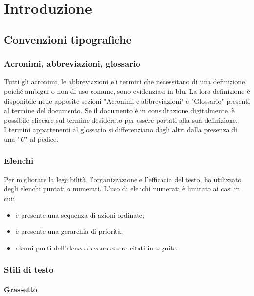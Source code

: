 \chapter{Introduzione}
\label{cap:introduzione}

\section{Convenzioni tipografiche}

\subsection{Acronimi, abbreviazioni, glossario}

Tutti gli acronimi, le abbreviazioni e i termini che necessitano di una definizione, poiché ambigui o non di uso comune, sono evidenziati in blu. La loro definizione è disponibile nelle apposite sezioni "Acronimi e abbreviazioni" e "Glossario" presenti al termine del documento. Se il documento è in consultazione digitalmente, è possibile cliccare sul termine desiderato per essere portati alla sua definizione.\\
I termini appartenenti al glossario si differenziano dagli altri dalla presenza di una "\textit{G}" al pedice.

\subsection{Elenchi}

Per migliorare la leggibilità, l'organizzazione e l'efficacia del testo, ho utilizzato degli elenchi puntati o numerati. L'uso di elenchi numerati è limitato ai casi in cui:
\begin{itemize}
    \item è presente una sequenza di azioni ordinate;
    \item è presente una gerarchia di priorità;
    \item alcuni punti dell'elenco devono essere citati in seguito.
\end{itemize}

\subsection{Stili di testo}

\subsubsection{\textbf{Grassetto}}

